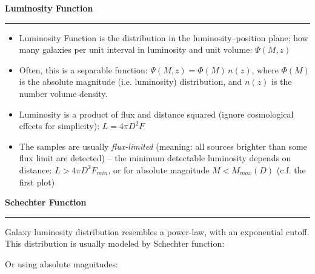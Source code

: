 \documentclass[letterpaper,landscape]{slides}
\begin{document}






\begin{slide}
\begin{center}
\bfseries
{\large {\color{red} Luminosity Function}}
\end{center}
\vskip 0.2in
\hrule


\begin{itemize}
\item { Luminosity Function is the distribution in the luminosity--position plane;
how many galaxies per unit interval in luminosity and unit volume:} $\Psi(M,z)$
\item
Often, this is a separable function: $\Psi(M,z) = \Phi(M) \, n(z)$, where $\Phi(M)$ is the
absolute magnitude (i.e. luminosity) distribution, and $n(z)$ is the number volume density. 
\item Luminosity is a product of flux and distance squared (ignore cosmological
effects for simplicity): { $L = 4 \pi D^2 F$}
\item
The samples are usually {\it flux-limited} (meaning: all sources brighter than some 
flux limit are detected) -- { the minimum detectable luminosity depends on distance}:
$L > 4 \pi D^2 F_{min}$, or for absolute magnitude $M < M_{max}(D)$ (c.f. the first plot)

\end{itemize}

\vfill
\end{slide}
 





\begin{slide}
\begin{center}
\bfseries
{\large {\color{red} Schechter Function}}
\end{center}
\vskip 0.2in
\hrule

Galaxy luminosity distribution resembles a power-law, with an exponential
cutoff. This distribution is usually modeled by Schechter function:


Or using absolute magnitudes:



\vfill
\end{slide}
 
\end{document}
